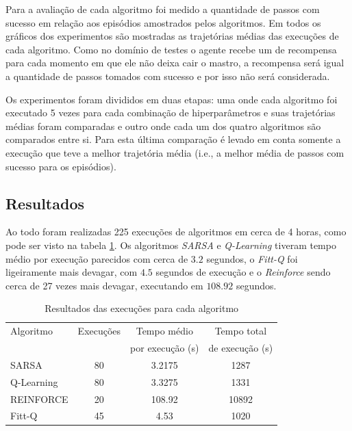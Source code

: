 \documentclass[letterpaper]{article}
\begin{document}
Para a avaliação de cada algoritmo foi medido a quantidade de passos com sucesso em relação aos episódios amostrados pelos algoritmos. Em todos os gráficos dos experimentos são mostradas as trajetórias médias das execuções de cada algoritmo. Como no domínio de testes o agente recebe um de recompensa para cada momento em que ele não deixa cair o mastro, a recompensa será igual a quantidade de passos tomados com sucesso e por isso não será considerada.

Os experimentos foram divididos em duas etapas: uma onde cada algoritmo foi executado 5 vezes para cada combinação de hiperparâmetros e suas trajetórias médias foram comparadas e outro onde cada um dos quatro algoritmos são comparados entre si. Para esta última comparação é levado em conta somente a execução que teve a melhor trajetória média  (i.e., a melhor média de passos com sucesso para os episódios).

\subsection{Resultados}

Ao todo foram realizadas 225 execuções de algoritmos em cerca de 4 horas, como pode ser visto na tabela \ref{table:hyperparameter-tuning-results}. Os algoritmos \textit{SARSA} e \textit{Q-Learning} tiveram tempo médio por execução parecidos com cerca de $3.2$ segundos, o \textit{Fitt-Q} foi ligeiramente mais devagar, com $4.5$ segundos de execução e o \textit{Reinforce} sendo cerca de 27 vezes mais devagar, executando em $108.92$ segundos.

\begin{table}[ht]
  \caption{Resultados das execuções para cada algoritmo}
  \label{table:hyperparameter-tuning-results}
  \begin{tabular}{lccc}
      \toprule
      Algoritmo  &  Execuções & Tempo médio      & Tempo total     \\
      {}         &  {}        & por execução (s) & de execução (s) \\
      \midrule
      SARSA      &         80 &           3.2175 &            1287 \\
      Q-Learning &         80 &           3.3275 &            1331 \\
      REINFORCE  &         20 &           108.92 &           10892 \\
      Fitt-Q     &         45 &             4.53 &            1020 \\
      \bottomrule
  \end{tabular}
\end{table}
\end{document}
